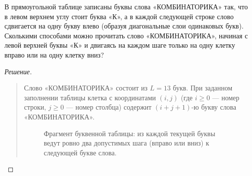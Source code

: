 \begin{problem}
    В прямоугольной таблице записаны буквы слова «КОМБИНАТОРИКА» так, что 
    в левом верхнем углу стоит буква «К», а в каждой следующей строке слово 
    сдвигается на одну букву влево (образуя диагональные слои одинаковых 
    букв). Сколькими способами можно прочитать слово «КОМБИНАТОРИКА», 
    начиная с левой верхней буквы «К» и двигаясь на каждом шаге только 
    на одну клетку вправо или на одну клетку вниз?
\end{problem}

\begin{proof}[Решение]~\\
    \begin{quote}
        Слово «КОМБИНАТОРИКА» состоит из $L = 13$ букв. При заданном 
        заполнении таблицы клетка с координатами $(i, j)$ (где 
        $i \ge 0$ --- номер строки, $j \ge 0$ --- номер столбца) содержит 
        $(i + j + 1)$-ю букву слова «КОМБИНАТОРИКА».

        \begin{figure}[H]
            \centering
            \caption{Фрагмент буквенной таблицы: из каждой текущей буквы 
            ведут ровно два допустимых шага (вправо или вниз) к следующей 
            букве слова.}
        \end{figure}


\end{quote}
\end{proof}
